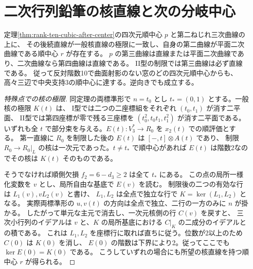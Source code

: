 \section{二次行列鉛筆の核直線と次の分岐中心}
\label{sec:rank-ten-flat-kernel-lines}
\begin{theorem}\label{thm:rank-ten-flat-kernel-lines}
定理\ref{thm:rank-ten-cubic-after-center}の四次元順中心 $p$ と第二ねじれ三次曲線の上に、
その後続直線が一般核直線の極限に一致し、自身の第二曲線が平面二次曲線である順中心 $r$ が存在する。
$p$ の第三曲線は直線または平面二次曲線であり、二次曲線なら第四曲線は直線である。
II型の制限では第三曲線は必ず直線である。
従って反対階数10で曲面射影のない窓のどの四次元順中心からも、
高々三辺で中央支持3の順中心に達する。逆向きでも成立する。
\end{theorem}
\begin{proof}[特殊点での核の極限]
同定理の両標準形で $n=t_0$ とし $t_*=(0,1)$ とする。一般核の極限 $K(t)$ は、
I型では二つの二座標組をそれぞれ $(t_0,t_1)$ が消す二平面、
II型では第四座標が零で残る三座標を $(t_0^2,t_0t_1,t_1^2)$ が消す二平面である。
いずれも全 $t$ で部分束を与える。$E(t):V_3^*\to R_0$ を $x_2(t)$ での順評価とする。
第一直線に $R_0$ を制限した後の $E(t)$ は $[-,t]\otimes A(t)$ であり、
制限 $R_0\to R_0|_{L}$ の核は一次元であった。$t\ne t_*$ で順中心があれば
$E(t)$ は階数2なのでその核は $K(t)$ そのものである。

そうでなければ順側欠損 $f_2=6-d_3\ge2$ は全て $t_*$ にある。
この点の局所一様化変数を $v$ とし、局所自由な基底で $E(v)$ を読む。
制限後の二つの有効な行は $L_1(v),vL_2(v)$ と書け、
$L_1,L_2$ は全点で独立な行で $K=\ker(L_1,L_2)$ となる。
実際両標準形の $u,v(t)$ の方向は全点で独立、二行の一方のみに $n$ が掛かる。
したがって単元な主元で消去し、一次元核側の行 $C(v)$ を戻すと、
三次小行列のイデアルは $v$ と、$K$ の局所基底における $C|_K$ の二成分のイデアルとの積である。
これは $L_1,L_2$ を座標行に取れば直ちに従う。位数が2以上のため $C(0)$ は $K(0)$ を消し、
$E(0)$ の階数は下界により2。従ってここでも $\ker E(0)=K(0)$ である。
こうしていずれの場合にも所望の核直線を持つ順中心 $r$ が得られる。
\end{proof}
